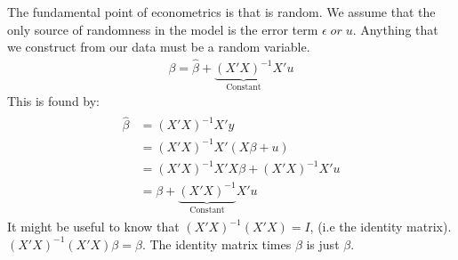 \documentclass[letterpaper,10pt,english]{jupyterBook}
\begin{document}
The fundamental point of econometrics is that  is random. We assume
that the only source of randomness in the model is the error term
\(\epsilon \; or \; u\). Anything that we construct from our data must be
a random variable.
\begin{equation*}
\begin{split}\beta  = \hat\beta + \underbrace{(X'X)^{-1}}_{\text{Constant}} X'u\end{split}
\end{equation*}
This is found by:
\begin{equation*}
\begin{split}\begin{aligned}
        \hat\beta &= (X'X)^{-1}X'y \\ 
        &=   (X'X)^{-1}X' (X\beta + u)  \\ 
        &=   (X'X)^{-1}X'X\beta + (X'X)^{-1}X'u \\
        &= \beta + \underbrace{(X'X)^{-1}}_{\text{Constant}} X'u 
    \end{aligned}\end{split}
\end{equation*}
It might be useful to know that \((X'X)^{-1}(X'X) = I\), (i.e the identity
matrix). \((X'X)^{-1}(X'X) \beta = \beta\). The identity matrix times
\(\beta\) is just \(\beta\).
\end{document}
